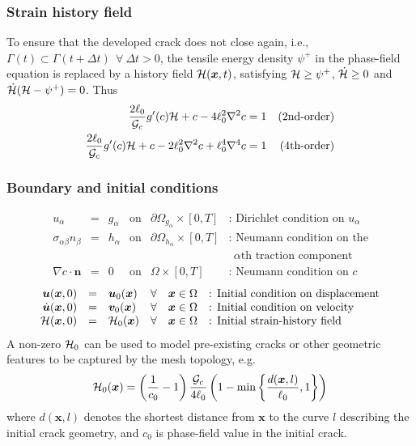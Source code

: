 \documentclass{beamer}
\begin{document}
\begin{frame}
  \frametitle{Strain history field}

  To ensure that the developed crack does not close again, i.e.,
  $\Gamma(t)\subset\Gamma(t+\Delta t) ~~\forall~\Delta t > 0$, the tensile energy
  density $\psi^+$ in the phase-field equation is replaced by a history field
  ${\cal H}(\bm{x},t)$, satisfying ${\cal H}\ge\psi^+$, $\dot{\cal H}\ge0$ and
  $\dot{\cal H}({\cal H} - \psi^+) = 0$.
  Thus
  \begin{align*}
    \frac{2\ell_0}{{\cal G}_c}g'(c){\cal H} + c - 4\ell_0^2\nabla^2c &= 1 & \text{(2nd-order)} \\
    \frac{2\ell_0}{{\cal G}_c}g'(c){\cal H} + c - 2\ell_0^2\nabla^2c + \ell_0^4\nabla^4c &= 1 & \text{(4th-order)}
  \end{align*}
\end{frame}

\begin{frame}
  \frametitle{Boundary and initial conditions}
  \[
    \begin{array}{rclcll}
      u_\alpha &=& g_\alpha &\mbox{on}& \partial\Omega_{g_\alpha}\times[0,T] & \mbox{: Dirichlet condition on~} u_\alpha \\
      \sigma_{\alpha\beta}n_\beta &=& h_\alpha &\mbox{on}& \partial\Omega_{h_\alpha}\times[0,T] & \mbox{: Neumann condition on the} \\ & & & & &
                                                                                                                                                 ~~\alpha \mbox{th traction component} \\
      \nabla c\cdot\bm{n} &=& 0 &\mbox{on}& \Omega\times[0,T] & \mbox{: Neumann condition on~} c
    \end{array}
  \]
  \[
    \begin{array}{rclcll}
      \bm{u}(\bm{x},0) &=& \bm{u}_0(\bm{x}) &\forall& \bm{x}\in\Omega &
                                                                        \mbox{: Initial condition on displacement} \\
      \dot{\bm{u}}(\bm{x},0) &=& \bm{v}_0(\bm{x}) &\forall& \bm{x}\in\Omega &
                                                                              \mbox{: Initial condition on velocity} \\
      {\cal H}(\bm{x},0) &=& {\cal H}_0(\bm{x}) &\forall& \bm{x}\in\Omega &
                                                                            \mbox{: Initial strain-history field}
    \end{array}
  \]
  A non-zero ${\cal H}_0$ can be used to model pre-existing cracks or other
  geometric features to be captured by the mesh topology, e.g.
  \[
    {\cal H}_0(\bm{x}) =
    \left(\frac{1}{c_0}-1\right)\frac{{\cal G}_c}{4\ell_0}
    \left(1-\min\left\{\frac{d(\bm{x},l)}{\ell_0},1\right\}\right)
  \]
  where $d(\bm{x},l)$ denotes the shortest distance from $\bm{x}$ to the curve $l$
  describing the initial crack geometry, and $c_0$ is phase-field value in the
  initial crack.
\end{frame}
\end{document}
